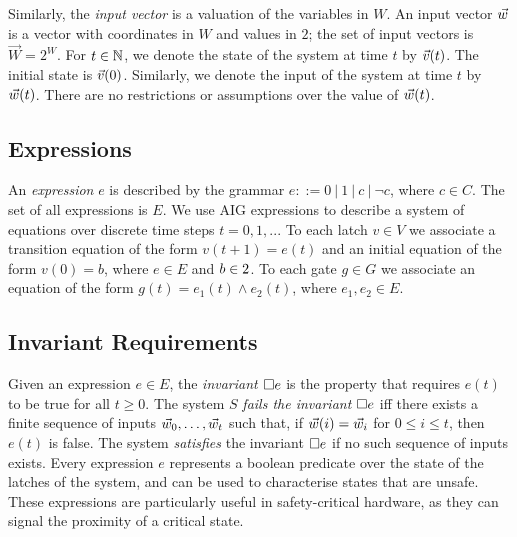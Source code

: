 Similarly, the \emph{input vector} is a
valuation of the variables in $W$. An input vector $\vec{w}$ is a vector with coordinates in $W$ and values in $2$; the set of input vectors is $\vec{W}=2^W$. 
For  $t\in \mathbb{N}$, we denote the state of the system at time $t$ by $\vec{v}(t)$.
The initial state is $\vec{v}(0)$. %
Similarly, we denote the input of the system at time $t$ by $\vec{w}(t)$. %
There are no restrictions or assumptions over the value of $\vec{w}(t)$.%

\subsection{Expressions}
An \emph{expression} $e$ is described by the grammar $e::= 0\ |\ 1\ |\ c\ |\ \lnot c$, where $c \in C$. The set of all expressions is $E$. We use AIG expressions to describe a system of equations over discrete time steps $t=0,1,..$. To each latch $v\in V$ we associate a transition {equation} of the form $v(t+1) = e(t)$ and an initial equation of the form $v(0)=b$, where $e\in E$ and $b\in 2$. To each gate $g\in G$ we associate an equation of the form $g(t)=e_1(t)\land e_2(t)$, where $e_1,e_2\in E$. 

\subsection{Invariant Requirements}
Given an expression $e\in E$, the \emph{invariant ${{\square}} e$} is the property that requires $e(t)$ to be true for all $t\geq 0$. The system $S$ \emph{fails the invariant ${{\square}} e$} iff there exists a finite sequence of inputs ${\vec{w}_0, \ldots, \vec{w}_t}$ such that, if $\vec{w}(i)=\vec{w}_i$ for $0\leq i \leq t$, then $e(t)$ is false. The system \emph{satisfies} the invariant ${{\square}} e$ if no such sequence of inputs exists. Every expression $e$ represents a boolean predicate over the state of the latches of the system, and can be used to characterise states that are unsafe. These expressions are particularly useful in safety-critical hardware, as they can signal the proximity of a critical state.

